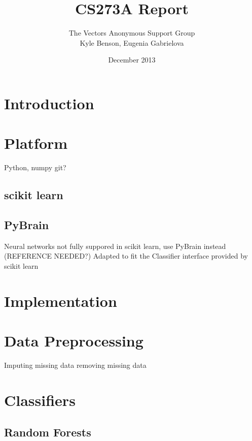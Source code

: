 \documentclass{article}
\title{CS273A Report}
\author{The Vectors Anonymous Support Group\\Kyle Benson, Eugenia Gabrielova}
\date{December 2013}
\begin{document}
\maketitle

\section{Introduction}


\section{Platform}

Python, numpy
git?

\subsection{scikit learn}

\subsection{PyBrain}

Neural networks not fully suppored in scikit learn, use PyBrain instead (REFERENCE NEEDED?)
Adapted to fit the Classifier interface provided by scikit learn


\section{Implementation}


\section{Data Preprocessing}

Imputing missing data
removing missing data


\section{Classifiers}

\subsection{Random Forests}
\end{document}
